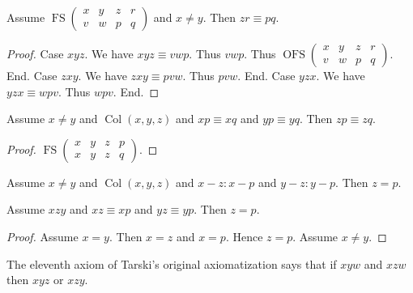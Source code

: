 \documentclass[10pt,a4paper,parskip=half,numbers=endperiod,headings=standardclasses,parskip]{scrbook}
\newcommand{\Cong}[4]{#1 #2 \equiv #3 #4}
\newcommand{\Betw}[3]{#1 #2 #3}
\newcommand{\Col}[3]{\operatorname{Col}(#1, #2, #3)}
\newcommand{\SenaryCong}[6]{#1 #2 #3 \equiv #4 #5 #6}
\newcommand{\OFS}[8]{\operatorname{OFS}
\left(\begin{smallmatrix}%
#1 & #2 & #3 & #4 \\
#5 & #6 & #7 & #8
\end{smallmatrix}\right)%
}
\newcommand{\FS}[8]{\operatorname{FS}
\left(\begin{smallmatrix}%
#1 & #2 & #3 & #4 \\
#5 & #6 & #7 & #8
\end{smallmatrix}\right)%
}
\begin{document}
  \begin{forthel}
    \begin{axiom} %
      Assume $\FS{x}{y}{z}{r}{v}{w}{p}{q}$ and $x \neq y$.
      Then $\Cong{z}{r}{p}{q}$.
    \end{axiom}
  \end{forthel}
    \begin{proof}
      Case $\Betw{x}{y}{z}$.
        We have $\SenaryCong{x}{y}{z}{v}{w}{p}$.
        Thus $\Betw{v}{w}{p}$.
        Thus $\OFS{x}{y}{z}{r}{v}{w}{p}{q}$.
      End.
      Case $\Betw{z}{x}{y}$.
        We have $\SenaryCong{z}{x}{y}{p}{v}{w}$.
        Thus $\Betw{p}{v}{w}$.
      End.
      Case $\Betw{y}{z}{x}$.
        We have $\SenaryCong{y}{z}{x}{w}{p}{v}$.
        Thus $\Betw{w}{p}{v}$.
      End.
    \end{proof}


  \begin{forthel}
    \begin{lemma} %
      Assume $x \neq y$ and $\Col{x}{y}{z}$ and
      $\Cong{x}{p}{x}{q}$ and
      $\Cong{y}{p}{y}{q}$. Then
      $\Cong{z}{p}{z}{q}$.
    \end{lemma}
    \begin{proof}
    	$\FS{x}{y}{z}{p}{x}{y}{z}{q}$.
    \end{proof}


    \begin{lemma} %
      Assume $x \neq y$ and $\Col{x}{y}{z}$ and $x-z : x-p$ and $y-z : y-p$. Then $z = p$.
    \end{lemma}

    \begin{lemma} %
      Assume $\Betw{x}{z}{y}$ and $\Cong{x}{z}{x}{p}$ and $\Cong{y}{z}{y}{p}$.
      Then $z = p$.
    \end{lemma}
    \begin{proof}
      Assume $x = y$. Then $x = z$ and $x = p$. Hence $z = p$. Assume $x \neq y$.
    \end{proof}
  \end{forthel}

  The eleventh axiom of Tarski's original axiomatization says that
  if $\Betw{x}{y}{w}$ and $\Betw{x}{z}{w}$
  then $\Betw{x}{y}{z}$ or $\Betw{x}{z}{y}$.
\end{document}
